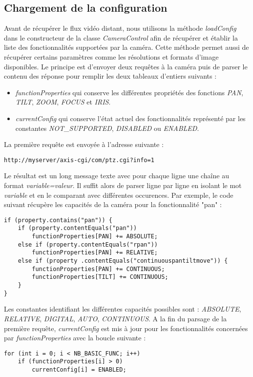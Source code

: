 \subsection{Chargement de la configuration}
Avant de récupérer le flux vidéo distant, nous utilisons la méthode \textit{loadConfig} dans le constructeur de la classe \textit{CameraControl} afin de récupérer et établir la liste des fonctionnalités supportées par la caméra. Cette méthode permet aussi de récupérer certains paramètres comme les résolutions et formats d'image disponibles.
Le principe est d'envoyer deux requêtes à la caméra puis de parser le contenu des réponse pour remplir les deux tableaux d'entiers suivants :
\begin{itemize}
	\item \textit{functionProperties} qui conserve les différentes propriétés des fonctions \textit{PAN}, \textit{TILT}, \textit{ZOOM}, \textit{FOCUS} et \textit{IRIS}.
	\item \textit{currentConfig} qui conserve l'état actuel des fonctionnalités
	représenté par les constantes \textit{NOT\_SUPPORTED}, \textit{DISABLED} ou \textit{ENABLED}.
\end{itemize}
La première requête est envoyée à l'adresse suivante :
\begin{lstlisting}
http://myserver/axis-cgi/com/ptz.cgi?info=1
\end{lstlisting}
Le résultat est un long message texte avec pour chaque ligne une chaîne au format \textit{variable=valeur}.
Il suffit alors de parser ligne par ligne en isolant le mot \textit{variable} et en le comparant avec différentes occurences.
Par exemple, le code suivant récupère les capacités de la caméra pour la fonctionnalité "pan" :
\begin{lstlisting}
if (property.contains("pan")) {
	if (property.contentEquals("pan"))
		functionProperties[PAN] += ABSOLUTE;
	else if (property.contentEquals("rpan"))
		functionProperties[PAN] += RELATIVE;
	else if (property .contentEquals("continuouspantiltmove")) {
		functionProperties[PAN] += CONTINUOUS;
		functionProperties[TILT] += CONTINUOUS;
	}
}
\end{lstlisting}
Les constantes identifiant les différentes capacités possibles sont : \textit{ABSOLUTE}, \textit{RELATIVE}, \textit{DIGITAL}, \textit{AUTO}, \textit{CONTINUOUS}.
A la fin du parsage de la première requête, \textit{currentConfig} est mis à jour pour les fonctionnalités concernées par \textit{functionProperties} avec la boucle suivante :
\begin{lstlisting}
for (int i = 0; i < NB_BASIC_FUNC; i++)
	if (functionProperties[i] > 0)
		currentConfig[i] = ENABLED;
\end{lstlisting}

